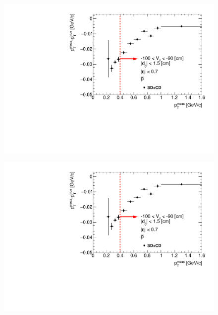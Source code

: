 \begin{figure}[H]
{  \includegraphics[width=\linewidth,page=17]{graphics/energyLoss/energyLoss3DGlobal_OnePrtAlso.pdf}\\
}%
\end{figure}

\begin{figure}[H]\ContinuedFloat
\vspace{-3.5em}
\parbox{0.329\textwidth}{
  \includegraphics[width=\linewidth,page=18]{graphics/energyLoss/energyLoss3DGlobal_OnePrtAlso.pdf}\\
  \vspace{-4em}
}~
\end{figure}

